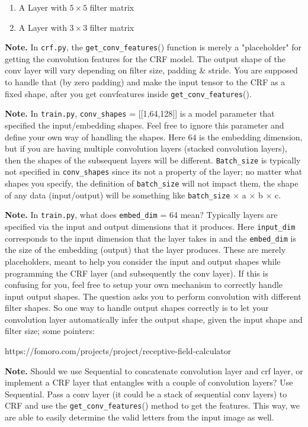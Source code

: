 \documentclass[11pt]{report}
\begin{document}
\begin{itemize}
\begin{enumerate}
	\item A Layer with \(5 \times 5\) filter matrix
	\item A Layer with \(3 \times 3\) filter matrix
\end{enumerate}

{\bf Note.} In \verb#crf.py#, the \verb#get_conv_features#() function is merely a "placeholder" for getting the convolution features for the CRF model. The output shape of the conv layer will vary depending on filter size, padding \& stride. You are supposed to handle that (by zero padding) and make the input tensor to the CRF as a fixed shape, after you get convfeatures inside \verb#get_conv_features#().

{\bf Note.} In \verb#train.py#, \verb#conv_shapes# = [[1,64,128]] is a model parameter that specified the input/embedding shapes. Feel free to ignore this parameter and define your own way of handling the shapes. Here $64$ is the embedding dimension, but if you are having multiple convolution layers (stacked convolution layers), then the shapes of the subsequent layers will be different. \verb#Batch_size# is typically not specified in \verb#conv_shapes# since its not a property of the layer; no matter what shapes you specify, the definition of \verb#batch_size# will not impact them, the shape of any data (input/output) will be something like \verb#batch_size# $\times$ a $\times$ b $\times$ c.


{\bf Note.} In \verb#train.py#, what does \verb#embed_dim# = 64 mean? Typically layers are specified via the input and output dimensions that it produces. Here \verb#input_dim# corresponds to the input dimension that the layer takes in and the \verb#embed_dim# is the size of the embedding (output) that the layer produces. These are merely placeholders, meant to help you consider the input and output shapes while programming the CRF layer (and subsequently the conv layer). If this is confusing for you, feel free to setup your own mechanism to correctly handle input output shapes.
The question asks you to perform convolution with different filter shapes. So one way to handle output shapes correctly is to let your convolution layer automatically infer the output shape, given the input shape and filter size; some pointers:

https://fomoro.com/projects/project/receptive-field-calculator

{\bf Note.} Should we use Sequential to concatenate convolution layer and crf layer, or implement a CRF layer that entangles with a couple of convolution layers? Use Sequential. Pass a conv layer (it could be a stack of sequential conv layers) to CRF and use the \verb#get_conv_features#() method to get the features. This way, we are able to easily determine the valid letters from the input image as well. 


\end{itemize}
\end{document}
